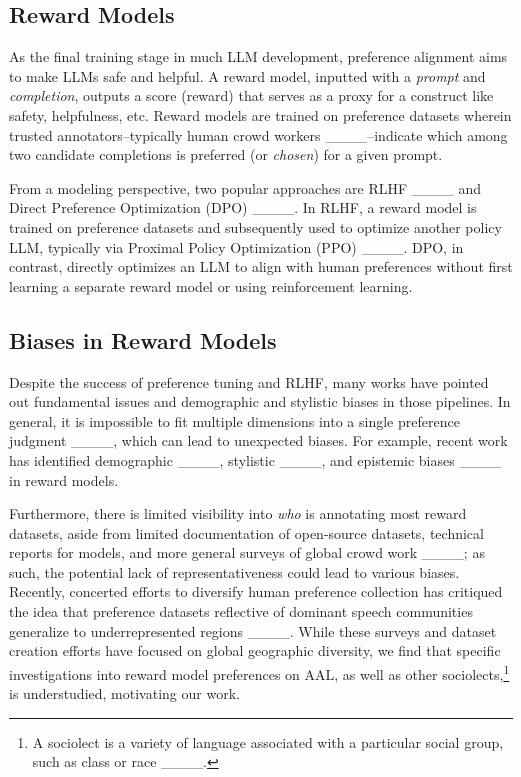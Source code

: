 \subsection{Reward Models}
As the final training stage in much LLM development, preference alignment aims to make LLMs safe and helpful. A reward model, inputted with a \textit{prompt} and \textit{completion}, outputs a score (reward) that serves as a proxy for a construct like safety, helpfulness, etc. Reward models are trained on preference datasets wherein trusted annotators--typically human crowd workers ____--indicate which among two candidate completions is preferred (or \textit{chosen}) for a given prompt.

From a modeling perspective, two popular approaches are RLHF ____ and Direct Preference Optimization (DPO) ____. In RLHF, a reward model is trained on preference datasets and subsequently used to optimize another policy LLM, typically via Proximal Policy Optimization (PPO) ____. DPO, in contrast, directly optimizes an LLM to align with human preferences without first learning a separate reward model or using reinforcement learning. 

\subsection{Biases in Reward Models}
Despite the success of preference tuning and RLHF, many works have pointed out fundamental issues and demographic and stylistic biases in those pipelines. In general, it is impossible to fit multiple dimensions into a single preference judgment ____, which can lead to unexpected biases. For example, recent work has identified demographic ____, stylistic ____, and epistemic biases ____ in reward models. 

Furthermore, there is limited visibility into \textit{who} is annotating most reward datasets, aside from limited documentation of open-source datasets, technical reports for models, and more general surveys of global crowd work ____; as such, the potential lack of representativeness could lead to various biases. Recently, concerted efforts to diversify human preference collection has critiqued the idea that preference datasets reflective of dominant speech communities generalize to underrepresented regions ____. While these surveys and dataset creation efforts have focused on global geographic diversity, we find that specific investigations into reward model preferences on AAL, as well as other sociolects,\footnote{A sociolect is a variety of language associated with a particular social group, such as class or race ____.} is understudied, motivating our work.

